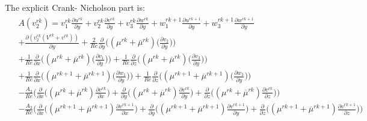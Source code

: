 \documentclass[preprint,12pt]{article}
\begin{document}
The explicit Crank- Nicholson part is:
\begin{align}\begin{split}
&A(v_2^{rk})=v_1^{rk}\frac{\partial u^{rk}}{\partial y}+v_2^{rk}\frac{\partial v^{rk}}{\partial y}+v_3^{rk}\frac{\partial w^{rk}}{\partial y}+w_1^{rk+1}\frac{\partial u^{rk+1}}{\partial y}+w_3^{rk+1}\frac{\partial w^{rk+1}}{\partial y}\\&+\frac{\partial (v_2^{rk}(V^{rk}+v^{rk}))}{\partial y}+\frac{2}{Re}\frac{\partial}{\partial y}\Big(({\mu}^{rk}+\overline{\mu}^{rk})\Big(\frac{\partial v_2}{\partial y}\Big)\Big)\\&+\frac{1}{Re}\frac{\partial}{\partial x}\Big(({\mu}^{rk}+\overline{\mu}^{rk})\Big(\frac{\partial v_1}{\partial y}\Big)\Big)+\frac{1}{Re}\frac{\partial}{\partial z}\Big(({\mu}^{rk}+\overline{\mu}^{rk})\Big(\frac{\partial v_3}{\partial y}\Big)\Big)\\&+\frac{1}{Re}\frac{\partial}{\partial x}\Big(({\mu}^{rk+1}+\overline{\mu}^{rk+1})\Big(\frac{\partial w_1}{\partial y}\Big)\Big)+\frac{1}{Re}\frac{\partial}{\partial z}\Big(({\mu}^{rk+1}+\overline{\mu}^{rk+1})\Big(\frac{\partial w_3}{\partial y}\Big)\Big)\\&-\frac{A_2}{Re}\Bigg(\frac{\partial}{\partial x}\Big((\mu^{rk}+\overline{\mu}^{rk})\frac{\partial v^{rk}}{\partial x}\Big)+\frac{\partial}{\partial y}\Big((\mu^{rk}+\overline{\mu}^{rk})\frac{\partial v^{rk}}{\partial y}\Big)+\frac{\partial}{\partial z}\Big((\mu^{rk}+\overline{\mu}^{rk})\frac{\partial v^{rk}}{\partial z}\Big)\Bigg)\\&-\frac{A_2}{Re}\Bigg(\frac{\partial}{\partial x}\Big((\mu^{rk+1}+\overline{\mu}^{rk+1})\frac{\partial v^{rk+1}}{\partial x}\Big)+\frac{\partial}{\partial y}\Big((\mu^{rk+1}+\overline{\mu}^{rk+1})\frac{\partial v^{rk+1}}{\partial y}\Big)+\frac{\partial}{\partial z}\Big((\mu^{rk+1}+\overline{\mu}^{rk+1})\frac{\partial v^{rk+1}}{\partial z}\Big)\Bigg)
\end{split} \end{align}	
\end{document}
